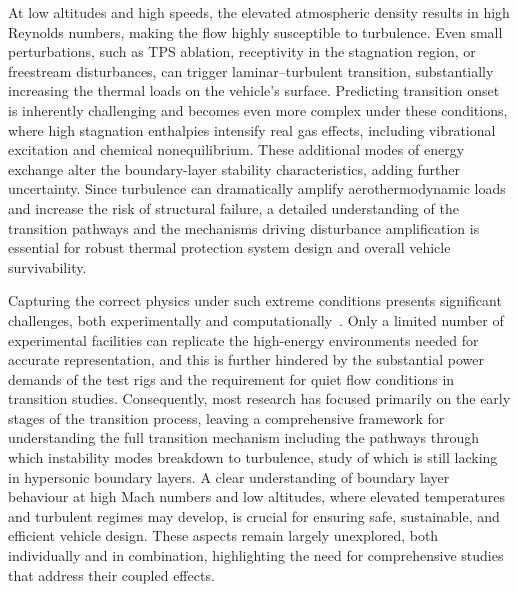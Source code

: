 At low altitudes and high speeds, the elevated atmospheric density results in high Reynolds numbers, making the flow highly susceptible to turbulence. Even small perturbations, such as \gls{TPS} ablation, receptivity in the stagnation region, or freestream disturbances, can trigger laminar–turbulent transition, substantially increasing the thermal loads on the vehicle’s surface. Predicting transition onset is inherently challenging and becomes even more complex under these conditions, where high stagnation enthalpies intensify real gas effects, including vibrational excitation and chemical nonequilibrium. These additional modes of energy exchange alter the boundary-layer stability characteristics, adding further uncertainty. Since turbulence can dramatically amplify aerothermodynamic loads and increase the risk of structural failure, a detailed understanding of the transition pathways and the mechanisms driving disturbance amplification is essential for robust thermal protection system design and overall vehicle survivability.


Capturing the correct physics under such extreme conditions presents significant challenges, both experimentally and computationally~\citep{DiRenzo2021}. Only a limited number of experimental facilities can replicate the high-energy environments needed for accurate representation, and this is further hindered by the substantial power demands of the test rigs and the requirement for quiet flow conditions in transition studies. Consequently, most research has focused primarily on the early stages of the transition process, leaving a comprehensive framework for understanding the full transition mechanism including the pathways through which instability modes breakdown to turbulence, study of which is still lacking in hypersonic boundary layers. A clear understanding of boundary layer behaviour at high Mach numbers and low altitudes, where elevated temperatures and turbulent regimes may develop, is crucial for ensuring safe, sustainable, and efficient vehicle design. These aspects remain largely unexplored, both individually and in combination, highlighting the need for comprehensive studies that address their coupled effects.




